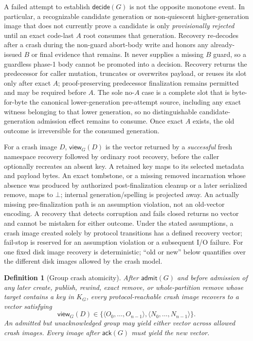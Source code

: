 \documentclass[10pt,twocolumn]{article}
\newtheorem{definition}{Definition}
\theoremstyle{remark}
\newcommand{\absent}{\bot}
\newcommand{\view}{\mathsf{view}}
\begin{document}
A failed attempt to establish $\mathsf{decide}(G)$ is not the opposite monotone event. In
particular, a recognizable candidate generation or non-quiescent higher-generation image that does
not currently prove a candidate is only \emph{provisionally rejected} until an exact code-last $A$
root consumes that generation. Recovery re-decodes after a crash during the non-guard abort-body
write and honors any already-issued $B$ or final evidence that remains. It never supplies a missing
$B$ guard, so a guardless phase-1 body cannot be promoted into a decision. Recovery
returns the predecessor for caller mutation, truncates or overwrites payload, or reuses its slot only
after exact $A$; proof-preserving predecessor finalization remains permitted and may be required
before $A$. The sole no-$A$ case is a complete slot
that is byte-for-byte the canonical lower-generation pre-attempt source, including any exact witness
belonging to that lower generation, so no distinguishable candidate-generation admission effect
remains to consume. Once exact $A$ exists, the old outcome is irreversible for the consumed
generation.

For a crash image $D$, $\view_G(D)$ is the vector returned by a \emph{successful} fresh namespace
recovery followed by ordinary root recovery, before the caller optionally recreates an absent key.
A retained key maps to its selected metadata and payload bytes. An exact tombstone, or a missing
removed incarnation whose absence was produced by authorized post-finalization cleanup or a later
serialized remove, maps to $\absent$; internal generation/spelling is projected away. An actually
missing pre-finalization path is an assumption violation, not an old-vector encoding. A recovery
that detects corruption and fails closed returns
no vector and cannot be mistaken for either outcome. Under the stated assumptions, a crash image
created solely by protocol transitions has a defined recovery vector; fail-stop is reserved for an
assumption violation or a subsequent I/O failure. For one fixed disk image recovery is
deterministic; ``old or new'' below quantifies over the different disk images allowed by the crash
model.

\begin{definition}[Group crash atomicity]\label{def:atomic}
After $\mathsf{admit}(G)$ and before admission of any later create, publish, rewind, exact remove,
or whole-partition remove whose target contains a key in $K_G$, every protocol-reachable crash image
recovers to a vector satisfying
\[
  \view_G(D) \in \{\langle O_0,\ldots,O_{n-1}\rangle,
                      \langle N_0,\ldots,N_{n-1}\rangle\}.
\]
An admitted but unacknowledged group may yield either vector across allowed crash images. Every
image after $\mathsf{ack}(G)$ must yield the new vector.
\end{definition}
\end{document}
